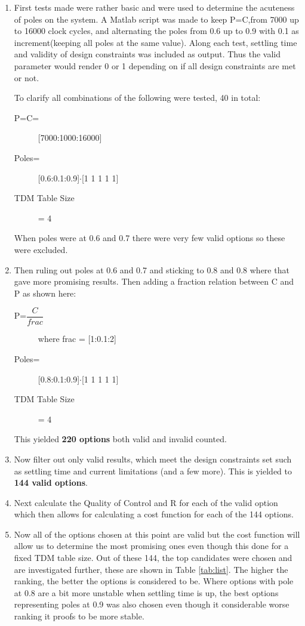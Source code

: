 \begin{enumerate}
	\item First tests made were rather basic and were used to determine the acuteness of poles on the system. A Matlab script was made to keep P=C,from 7000 up to 16000 clock cycles, and alternating the poles from 0.6 up to 0.9 with 0.1 as increment(keeping all poles at the same value). Along each test, settling time and validity of design constraints was included as output. Thus the valid parameter would render 0 or 1 depending on if all design constraints are met or not.
	
	To clarify all combinations of the following were tested, 40 in total:
	\begin{description}
		\item[P=C=] [7000:1000:16000]
		\item[Poles=] [0.6:0.1:0.9]$\cdot$[1 1 1 1 1]
		\item[TDM Table Size] = 4
	\end{description}
	When poles were at 0.6 and 0.7 there were very few valid options so these were excluded.
	
	\item Then ruling out poles at 0.6 and 0.7 and sticking to 0.8 and 0.8 where that gave more promising results. Then adding a fraction relation between C and P as shown here:
		\begin{description}
			\item[P=$\dfrac{C}{frac}$] where frac = [1:0.1:2]
			\item[Poles=] [0.8:0.1:0.9]$\cdot$[1 1 1 1 1]
			\item[TDM Table Size] = 4
		\end{description}
	This yielded \textbf{220 options} both valid and invalid counted.
	\item Now filter out only valid results, which meet the design constraints set such as settling time and current limitations (and a few more). This is yielded to \textbf{144 valid options}.
	\item Next calculate the Quality of Control and R for each of the valid option which then allows for calculating a cost function for each of the 144 options.
	\item Now all of the options chosen at this point are valid but the cost function will allow us to determine the most promising ones even though this done for a fixed TDM table size. Out of these 144, the top candidates were chosen and are investigated further, these are shown in Table \ref{tab:list}. The higher the ranking, the better the options is considered to be. Where options with pole at 0.8 are a bit more unstable when settling time is up, the best options representing poles at 0.9 was also chosen even though it considerable worse ranking it proofs to be more stable.
	

\end{enumerate}
